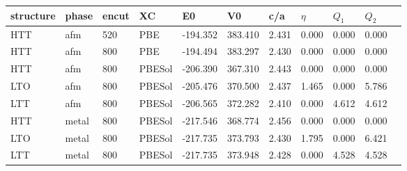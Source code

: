 \begin{tabular}{lllllllllll}
\toprule
structure &  phase & encut &      XC &       E0 &       V0 &    c/a &    $\eta$ &     $Q_1$ &     $Q_2$ \\
\midrule
      HTT &    afm &   520 &     PBE & -194.352 &  383.410 &  2.431 &  0.000 &  0.000 &  0.000 \\
      HTT &    afm &   800 &     PBE & -194.494 &  383.297 &  2.430 &  0.000 &  0.000 &  0.000 \\
      HTT &    afm &   800 &  PBESol & -206.390 &  367.310 &  2.443 &  0.000 &  0.000 &  0.000 \\
      LTO &    afm &   800 &  PBESol & -205.476 &  370.500 &  2.437 &  1.465 &  0.000 &  5.786 \\
      LTT &    afm &   800 &  PBESol & -206.565 &  372.282 &  2.410 &  0.000 &  4.612 &  4.612 \\
      HTT &  metal &   800 &  PBESol & -217.546 &  368.774 &  2.456 &  0.000 &  0.000 &  0.000 \\
      LTO &  metal &   800 &  PBESol & -217.735 &  373.793 &  2.430 &  1.795 &  0.000 &  6.421 \\
      LTT &  metal &   800 &  PBESol & -217.735 &  373.948 &  2.428 &  0.000 &  4.528 &  4.528 \\
\bottomrule
\end{tabular}
